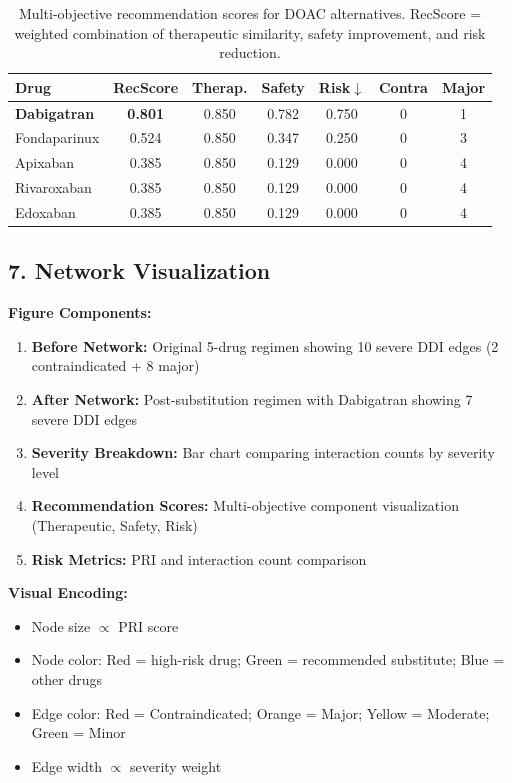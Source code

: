 \documentclass[11pt,a4paper]{article}
\begin{document}
\begin{table}[h]
\centering
\small
\begin{tabular}{@{}lcccccc@{}}
\toprule
\textbf{Drug} & \textbf{RecScore} & \textbf{Therap.} & \textbf{Safety} & \textbf{Risk$\downarrow$} & \textbf{Contra} & \textbf{Major} \\
\midrule
\textbf{Dabigatran} & \textbf{0.801} & 0.850 & 0.782 & 0.750 & 0 & 1 \\
Fondaparinux & 0.524 & 0.850 & 0.347 & 0.250 & 0 & 3 \\
Apixaban & 0.385 & 0.850 & 0.129 & 0.000 & 0 & 4 \\
Rivaroxaban & 0.385 & 0.850 & 0.129 & 0.000 & 0 & 4 \\
Edoxaban & 0.385 & 0.850 & 0.129 & 0.000 & 0 & 4 \\
\bottomrule
\end{tabular}
\caption{Multi-objective recommendation scores for DOAC alternatives. RecScore = weighted combination of therapeutic similarity, safety improvement, and risk reduction.}
\end{table}

\subsection*{7. Network Visualization}

\textbf{Figure Components:}
\begin{enumerate}[label=(\roman*)]
    \item \textbf{Before Network:} Original 5-drug regimen showing 10 severe DDI edges (2 contraindicated + 8 major)
    \item \textbf{After Network:} Post-substitution regimen with Dabigatran showing 7 severe DDI edges
    \item \textbf{Severity Breakdown:} Bar chart comparing interaction counts by severity level
    \item \textbf{Recommendation Scores:} Multi-objective component visualization (Therapeutic, Safety, Risk)
    \item \textbf{Risk Metrics:} PRI and interaction count comparison
\end{enumerate}

\textbf{Visual Encoding:}
\begin{itemize}
    \item Node size $\propto$ PRI score
    \item Node color: Red = high-risk drug; Green = recommended substitute; Blue = other drugs
    \item Edge color: Red = Contraindicated; Orange = Major; Yellow = Moderate; Green = Minor
    \item Edge width $\propto$ severity weight
\end{itemize}
\end{document}
